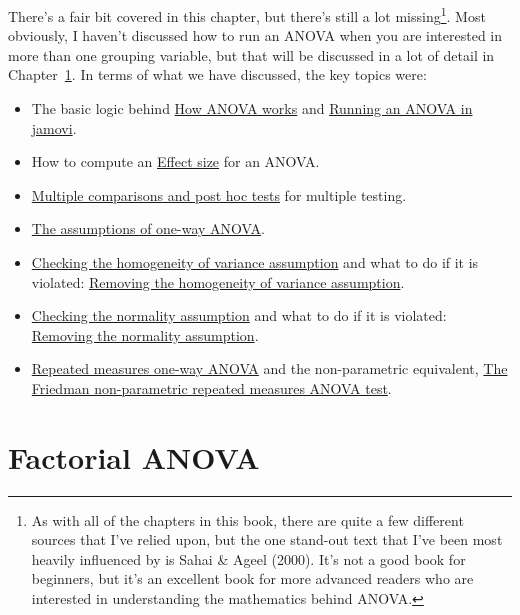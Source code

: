 \documentclass[
  a4paper,
]{book}
\providecommand{\tightlist}{%
  \setlength{\itemsep}{0pt}\setlength{\parskip}{0pt}}\usepackage{longtable,booktabs,array}
\begin{document}
There's a fair bit covered in this chapter, but there's still a lot
missing\footnote{As with all of the chapters in this book, there are
  quite a few different sources that I've relied upon, but the one
  stand-out text that I've been most heavily influenced by is Sahai \&
  Ageel (2000). It's not a good book for beginners, but it's an
  excellent book for more advanced readers who are interested in
  understanding the mathematics behind ANOVA.}. Most obviously, I
haven't discussed how to run an ANOVA when you are interested in more
than one grouping variable, but that will be discussed in a lot of
detail in Chapter~\ref{sec-Factorial-ANOVA}. In terms of what we have
discussed, the key topics were:

\begin{itemize}
\tightlist
\item
  The basic logic behind \protect\hyperlink{sec-How-ANOVA-works}{How
  ANOVA works} and
  \protect\hyperlink{running-an-anova-in-jamovi}{Running an ANOVA in
  jamovi}.
\item
  How to compute an \protect\hyperlink{effect-size}{Effect size} for an
  ANOVA.
\item
  \protect\hyperlink{multiple-comparisons-and-post-hoc-tests}{Multiple
  comparisons and post hoc tests} for multiple testing.
\item
  \protect\hyperlink{the-assumptions-of-one-way-anova}{The assumptions
  of one-way ANOVA}.
\item
  \protect\hyperlink{sec-Checking-the-homogeneity-of-variance-assumption}{Checking
  the homogeneity of variance assumption} and what to do if it is
  violated:
  \protect\hyperlink{removing-the-homogeneity-of-variance-assumption}{Removing
  the homogeneity of variance assumption}.
\item
  \protect\hyperlink{sec-Checking-the-normality-assumption}{Checking the
  normality assumption} and what to do if it is violated:
  \protect\hyperlink{removing-the-normality-assumption}{Removing the
  normality assumption}.
\item
  \protect\hyperlink{repeated-measures-one-way-anova}{Repeated measures
  one-way ANOVA} and the non-parametric equivalent,
  \protect\hyperlink{the-friedman-non-parametric-repeated-measures-anova-test}{The
  Friedman non-parametric repeated measures ANOVA test}.
\end{itemize}


\hypertarget{sec-Factorial-ANOVA}{%
\chapter{Factorial ANOVA}\label{sec-Factorial-ANOVA}}
\end{document}
